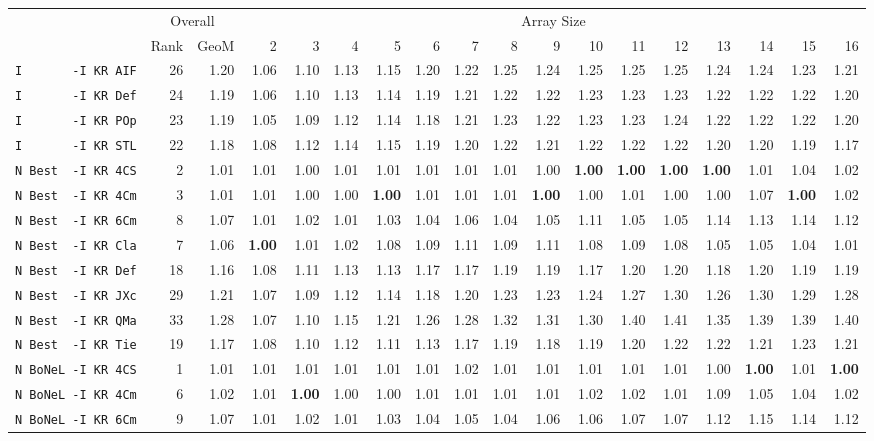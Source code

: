 \begin{tabular}{l | r r | r r r r r r r r r r r r r r r |}
 & \multicolumn{2}{c}{Overall} & \multicolumn{15}{c}{Array Size} \\
 & Rank & GeoM & 2&3&4&5&6&7&8&9&10&11&12&13&14&15&16\\ \hline
\verb+I       -I KR AIF+ & 26 & 1.20 & 1.06&1.10&1.13&1.15&1.20&1.22&1.25&1.24&1.25&1.25&1.25&1.24&1.24&1.23&1.21\\
\verb+I       -I KR Def+ & 24 & 1.19 & 1.06&1.10&1.13&1.14&1.19&1.21&1.22&1.22&1.23&1.23&1.23&1.22&1.22&1.22&1.20\\
\verb+I       -I KR POp+ & 23 & 1.19 & 1.05&1.09&1.12&1.14&1.18&1.21&1.23&1.22&1.23&1.23&1.24&1.22&1.22&1.22&1.20\\
\verb+I       -I KR STL+ & 22 & 1.18 & 1.08&1.12&1.14&1.15&1.19&1.20&1.22&1.21&1.22&1.22&1.22&1.20&1.20&1.19&1.17\\
\verb+N Best  -I KR 4CS+ & 2 & 1.01 & 1.01&1.00&1.01&1.01&1.01&1.01&1.01&1.00&\textbf{1.00}&\textbf{1.00}&\textbf{1.00}&\textbf{1.00}&1.01&1.04&1.02\\
\verb+N Best  -I KR 4Cm+ & 3 & 1.01 & 1.01&1.00&1.00&\textbf{1.00}&1.01&1.01&1.01&\textbf{1.00}&1.00&1.01&1.00&1.00&1.07&\textbf{1.00}&1.02\\
\verb+N Best  -I KR 6Cm+ & 8 & 1.07 & 1.01&1.02&1.01&1.03&1.04&1.06&1.04&1.05&1.11&1.05&1.05&1.14&1.13&1.14&1.12\\
\verb+N Best  -I KR Cla+ & 7 & 1.06 & \textbf{1.00}&1.01&1.02&1.08&1.09&1.11&1.09&1.11&1.08&1.09&1.08&1.05&1.05&1.04&1.01\\
\verb+N Best  -I KR Def+ & 18 & 1.16 & 1.08&1.11&1.13&1.13&1.17&1.17&1.19&1.19&1.17&1.20&1.20&1.18&1.20&1.19&1.19\\
\verb+N Best  -I KR JXc+ & 29 & 1.21 & 1.07&1.09&1.12&1.14&1.18&1.20&1.23&1.23&1.24&1.27&1.30&1.26&1.30&1.29&1.28\\
\verb+N Best  -I KR QMa+ & 33 & 1.28 & 1.07&1.10&1.15&1.21&1.26&1.28&1.32&1.31&1.30&1.40&1.41&1.35&1.39&1.39&1.40\\
\verb+N Best  -I KR Tie+ & 19 & 1.17 & 1.08&1.10&1.12&1.11&1.13&1.17&1.19&1.18&1.19&1.20&1.22&1.22&1.21&1.23&1.21\\
\verb+N BoNeL -I KR 4CS+ & 1 & 1.01 & 1.01&1.01&1.01&1.01&1.01&1.02&1.01&1.01&1.01&1.01&1.01&1.00&\textbf{1.00}&1.01&\textbf{1.00}\\
\verb+N BoNeL -I KR 4Cm+ & 6 & 1.02 & 1.01&\textbf{1.00}&1.00&1.00&1.01&1.01&1.01&1.01&1.02&1.02&1.01&1.09&1.05&1.04&1.02\\
\verb+N BoNeL -I KR 6Cm+ & 9 & 1.07 & 1.01&1.02&1.01&1.03&1.04&1.05&1.04&1.06&1.06&1.07&1.07&1.12&1.15&1.14&1.12\\

\end{tabular}
